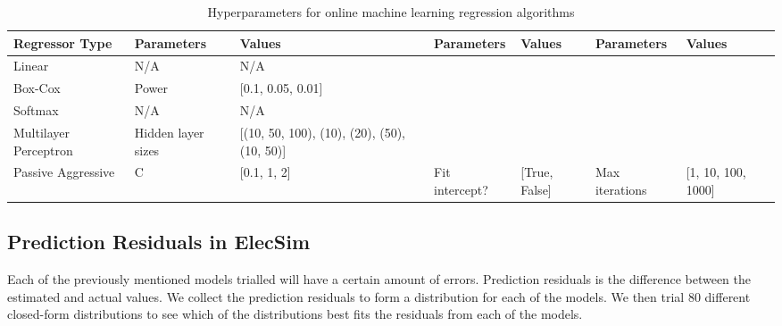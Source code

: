 \documentclass[final,3p,times,twocolumn,numbers]{elsarticle}
\begin{document}
\begin{table}[]
\begin{tabular}{@{}llp{2.5cm}lllp{1.6cm}@{}}
\toprule
\textbf{Regressor Type} & \textbf{Parameters} & \textbf{Values}                                  & \textbf{Parameters} & \textbf{Values}   & \textbf{Parameters} & \textbf{Values}        \\ \midrule
Linear                  & N/A                 & N/A                                              &                     &                   &                     &                        \\
Box-Cox                 & Power               & {[}0.1, 0.05, 0.01{]}                            &                     &                   &                     &                        \\
Softmax                 & N/A                 & N/A                                              &                     &                   &                     &                        \\
Multilayer Perceptron   & Hidden layer sizes  & {[}(10, 50, 100), (10),  (20), (50), (10, 50){]} & 
                    &                   &                     &                        \\ 
                    Passive Aggressive      & C                   & {[}0.1, 1, 2{]}                                  & Fit intercept?      & {[}True, False{]} & Max iterations      & {[}1, 10, 100, 1000{]} \\
\bottomrule
\end{tabular}
\caption{Hyperparameters for online machine learning regression algorithms}
\label{table:hyperparameter-tuning-online}
\end{table}



\subsection{Prediction Residuals in ElecSim}

Each of the previously mentioned models trialled will have a certain amount of errors. Prediction residuals is the difference between the estimated and actual values. We collect the prediction residuals to form a distribution for each of the models. We then trial 80 different closed-form distributions to see which of the distributions best fits the residuals from each of the models.
\end{document}

